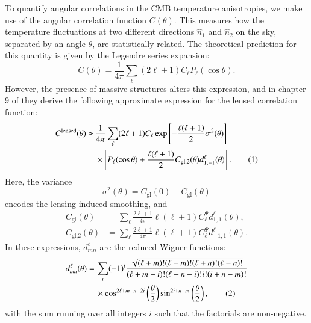 \documentclass{aa}
\newcommand\numberthis{\addtocounter{equation}{1}\tag{\theequation}}
\numberwithin{equation}{section}
\numberwithin{table}{section}
\numberwithin{figure}{section}
\begin{document}
To quantify angular correlations in the CMB temperature anisotropies, we make use of the angular correlation function $C(\theta)$. This measures how the temperature fluctuations at two different directions $\hat{n}_1$ and $\hat{n}_2$ on the sky, separated by an angle $\theta$, are statistically related. The theoretical prediction for this quantity is given by the Legendre series expansion:
\begin{equation}
C(\theta) = \frac{1}{4\pi} \sum_\ell (2\ell + 1) C_\ell P_\ell(\cos\theta).
\end{equation}
However, the presence of massive structures alters this expression, and in chapter 9 of \cite{LewisChallinor} they derive the following approximate expression for the lensed correlation function:
\begin{align*}
C^\text{lensed}(\theta) \approx \,&\frac{1}{4\pi} \sum_\ell (2\ell + 1) C_\ell \exp\left[-\frac{\ell(\ell+1)}{2}\sigma^2(\theta)\right] \\
 &\times\left[ P_\ell(\cos\theta) + \frac{\ell(\ell+1)}{2} C_\text{gl,2}(\theta) d^{\ell}_{1,-1}(\theta) \right]. \numberthis
\end{align*}
Here, the variance
\begin{equation}
  \sigma^2(\theta) = C_\text{gl}(0)-C_\text{gl}(\theta)
\end{equation}
encodes the lensing-induced smoothing, and
\begin{align}
  C_\text{gl}(\theta) &= \sum_\ell \frac{2\ell + 1}{4\pi} \ell(\ell+1) C_\ell^\Psi d_{1,1}^\ell(\theta),
  \\
  C_\text{gl,2}(\theta) &= \sum_\ell \frac{2\ell + 1}{4\pi} \ell(\ell+1) C_\ell^\Psi d_{-1,1}^\ell(\theta).
\end{align}
In these expressions, $d_{mn}^\ell$ are the reduced Wigner functions:
\begin{align*}
  d^\ell_{mn}(\theta) =\,& \sum_i (-1)^i  \frac{\sqrt{(\ell + m)! (\ell - m)! (\ell + n)! (\ell - n)!}}{(\ell + m - i)! (\ell - n - i)! i! (i + n - m)!} \\
  &\times\cos^{2\ell + m - n - 2i}\left(\frac{\theta}{2}\right) \sin^{2i + n - m}\left(\frac{\theta}{2}\right), \numberthis \label{eq: Wigner}
\end{align*}
with the sum running over all integers $i$ such that the factorials are non-negative. 
\end{document}
